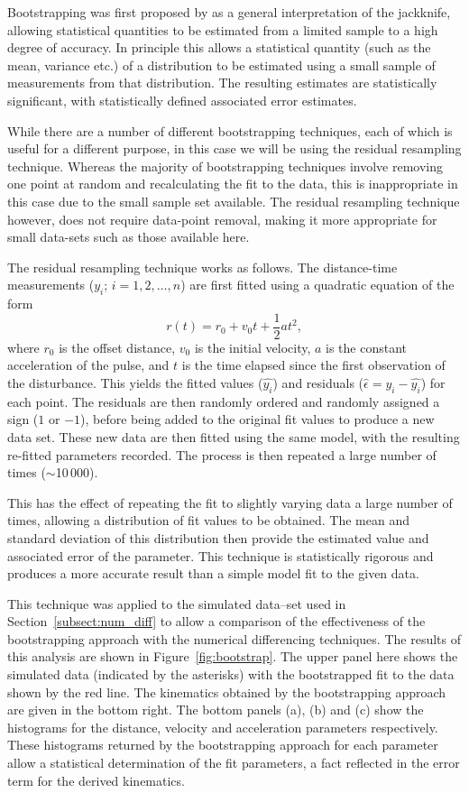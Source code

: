 \documentclass[structabstract]{aa}
\begin{document}
Bootstrapping was first proposed by \citet{Efron:1979p1831} as a general interpretation of the jackknife, allowing statistical quantities to be estimated from a limited sample to a high degree of accuracy. In principle this allows a statistical quantity (such as the mean, variance etc.) of a distribution to be estimated using a small sample of measurements from that distribution. The resulting estimates are statistically significant, with statistically defined associated error estimates. 

While there are a number of different bootstrapping techniques, each of which is useful for a different purpose, in this case we will be using the residual resampling technique. Whereas the majority of bootstrapping techniques involve removing one point at random and recalculating the fit to the data, this is inappropriate in this case due to the small sample set available. The residual resampling technique however, does not require data-point removal, making it more appropriate for small data-sets such as those available here.

The residual resampling technique works as follows. The distance-time measurements ($y_i$; $i=1, 2, \ldots, n$) are first fitted using a quadratic equation of the form
\begin{equation}
r(t) = r_0 + v_0 t + \frac{1}{2}a t^2,
\end{equation}
where $r_0$ is the offset distance, $v_0$ is the initial velocity, $a$ is the constant acceleration of the pulse, and $t$ is the time elapsed since the first observation of the disturbance. This yields the fitted values ($\hat{y_{i}}$) and residuals ($\hat{\epsilon}=y_{i} - \hat{y_{i}}$) for each point. The residuals are then randomly ordered and randomly assigned a sign ($1$ or $-1$), before being added to the original fit values to produce a new data set. These new data are then fitted using the same model, with the resulting re-fitted parameters recorded. The process is then repeated a large number of times ($\sim$10\,000).

This has the effect of repeating the fit to slightly varying data a large number of times, allowing a distribution of fit values to be obtained. The mean and standard deviation of this distribution then provide the estimated value and associated error of the parameter. This technique is statistically rigorous and produces a more accurate result than a simple model fit to the given data. 

This technique was applied to the simulated data--set used in Section~\ref{subsect:num_diff} to allow a comparison of the effectiveness of the bootstrapping approach with the numerical differencing techniques. The results of this analysis are shown in Figure~\ref{fig:bootstrap}. The upper panel here shows the simulated data (indicated by the asterisks) with the bootstrapped fit to the data shown by the red line. The kinematics obtained by the bootstrapping approach are given in the bottom right. The bottom panels (a), (b) and (c) show the histograms for the distance, velocity and acceleration parameters respectively. These histograms returned by the bootstrapping approach for each parameter allow a statistical determination of the fit parameters, a fact reflected in the error term for the derived kinematics. 
\end{document}
